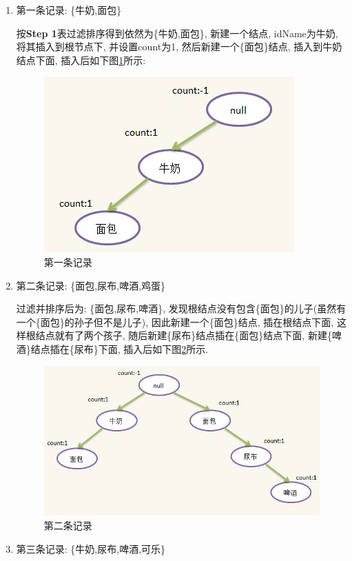 \documentclass[a4paper,UTF8]{ctexart}
\theoremstyle{plain} \newtheorem{theorem}{定理}[section]
\theoremstyle{plain} \newtheorem{definition}{定义}[section]
\theoremstyle{plain} \newtheorem{lemma}{引理}[section]
\theoremstyle{plain} \newtheorem{proposition}{命题}[section]
\theoremstyle{plain} \newtheorem{example}{例}[section]
\theoremstyle{plain} \newtheorem{remark}{注}[section]
\theoremstyle{plain} \newtheorem{corollary}{推论}[section]
\begin{document}
\begin{enumerate}[(1)]
\item 第一条记录: \{牛奶,面包\}

按\textbf{Step 1}表过滤排序得到依然为\{牛奶,面包\}, 新建一个结点, idName为{牛奶}, 将其插入到根节点下, 并设置count为1, 然后新建一个\{面包\}结点, 插入到{牛奶}结点下面, 插入后如下图\ref{tree1}所示:
\begin{figure}[!htb]
	\centering
	\includegraphics[width = 0.75 \textwidth]{tree1.jpg}
	\caption{第一条记录}
	\label{tree1}
\end{figure}


\item 第二条记录: \{面包,尿布,啤酒,鸡蛋\}

过滤并排序后为: \{面包,尿布,啤酒\}, 发现根结点没有包含\{面包\}的儿子(虽然有一个\{面包\}的孙子但不是儿子), 因此新建一个\{面包\}结点, 插在根结点下面, 这样根结点就有了两个孩子, 随后新建\{尿布\}结点插在\{面包\}结点下面, 新建\{啤酒\}结点插在\{尿布\}下面, 插入后如下图\ref{tree2}所示.
\begin{figure}[!htb]
	\centering
	\includegraphics[width = 0.75 \textwidth]{tree2.jpg}
	\caption{第二条记录}
	\label{tree2}
\end{figure}

\item 第三条记录: \{牛奶,尿布,啤酒,可乐\}


\end{enumerate}
\end{document}
